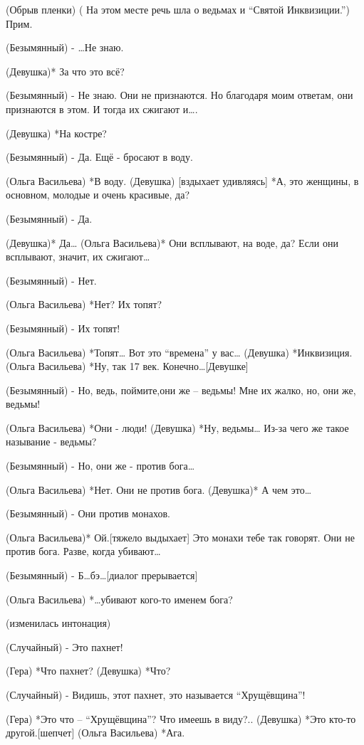 (Обрыв пленки) 
      ( На этом месте речь шла о ведьмах и “Святой Инквизиции.”) Прим.

(Безымянный) - …Не знаю.

(Девушка)* За что это всё?

(Безымянный) - Не знаю. Они не признаются. Но благодаря моим ответам, они признаются в этом. И тогда их сжигают и….

(Девушка) *На костре?

(Безымянный) - Да. Ещё -  бросают в воду.

(Ольга Васильева) *В воду.
(Девушка) [вздыхает удивляясь] *А, это женщины, в основном, молодые и очень красивые, да?

(Безымянный) - Да.

(Девушка)* Да…
(Ольга Васильева)* Они всплывают, на воде, да? Если они всплывают, значит, их сжигают…

(Безымянный) - Нет.

(Ольга Васильева) *Нет? Их топят?

(Безымянный) - Их топят!

(Ольга Васильева) *Топят… Вот это “времена” у вас…
(Девушка) *Инквизиция.
(Ольга Васильева) *Ну, так 17 век. Конечно…[Девушке]

(Безымянный) - Но, ведь, поймите,они же – ведьмы! Мне их жалко, но, они же, ведьмы!

(Ольга Васильева) *Они - люди!
(Девушка) *Ну, ведьмы… Из-за чего же такое называние - ведьмы?

(Безымянный) - Но, они же - против бога…

(Ольга Васильева) *Нет. Они не против бога.
(Девушка)* А чем это…

(Безымянный) - Они против монахов.

(Ольга Васильева)* Ой.[тяжело выдыхает] Это монахи тебе так говорят. Они не против бога. Разве,  когда убивают…

(Безымянный) - Б…бэ…[диалог прерывается] 

(Ольга Васильева) *…убивают кого-то именем бога?

(изменилась интонация)

(Случайный) - Это пахнет!

(Гера) *Что пахнет?
(Девушка) *Что?

(Случайный) - Видишь, этот пахнет, это называется “Хрущёвщина”!

(Гера) *Это что – “Хрущёвщина”? Что имеешь в виду?..
(Девушка) *Это кто-то другой.[шепчет]
(Ольга Васильева) *Ага.

